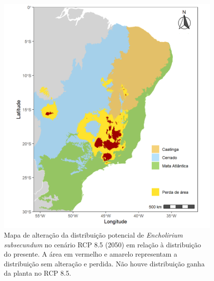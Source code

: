 \documentclass[
  11pt,
]{article}
\begin{document}
\begin{figure}
\centering
\includegraphics[width=1\textwidth,height=\textheight]{../Graficos/E_subsecundum_mapas_feitos/alteracao_RCP85.jpeg}
\caption{Mapa de alteração da distribuição potencial de
\emph{Encholirium subsecundum} no cenário RCP 8.5 (2050) em relação à
distribuição do presente. A área em vermelho e amarelo representam a
distribuição sem alteração e perdida. Não houve distribuição ganha da
planta no RCP 8.5.}
\end{figure}
\end{document}
